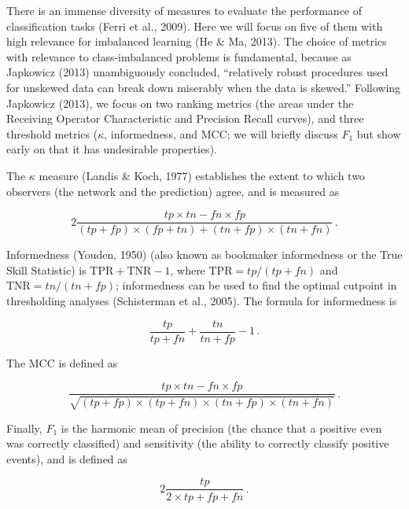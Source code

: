 \documentclass[11pt]{article}
\begin{document}
There is an immense diversity of measures to evaluate the performance of
classification tasks (Ferri et al., 2009). Here we will focus on five of
them with high relevance for imbalanced learning (He \& Ma, 2013). The
choice of metrics with relevance to class-imbalanced problems is
fundamental, because as Japkowicz (2013) unambiguously concluded,
``relatively robust procedures used for unskewed data can break down
miserably when the data is skewed.'' Following Japkowicz (2013), we
focus on two ranking metrics (the areas under the Receiving Operator
Characteristic and Precision Recall curves), and three threshold metrics
(\(\kappa\), informedness, and MCC; we will briefly discuss \(F_1\) but
show early on that it has undesirable properties).

The \(\kappa\) measure (Landis \& Koch, 1977) establishes the extent to
which two observers (the network and the prediction) agree, and is
measured as

\[
2\frac{tp\times tn - fn\times fp}{(tp+fp)\times (fp+tn)+(tn+fp)\times (tn+fn)} \,.
\]

Informedness (Youden, 1950) (also known as bookmaker informedness or the
True Skill Statistic) is \(\text{TPR}+\text{TNR}-1\), where
\(\text{TPR}= tp/(tp+fn)\) and \(\text{TNR} = tn/(tn+fp)\); informedness
can be used to find the optimal cutpoint in thresholding analyses
(Schisterman et al., 2005). The formula for informedness is

\[\frac{tp}{tp+fn}+\frac{tn}{tn+fp}-1\,.\]

The MCC is defined as

\[
\frac{tp\times tn - fn\times fp}{\sqrt{(tp+fp)\times (tp+fn)\times (tn+fp)\times (tn+fn)}} \,.
\]

Finally, \(F_1\) is the harmonic mean of precision (the chance that a
positive even was correctly classified) and sensitivity (the ability to
correctly classify positive events), and is defined as

\[
2\frac{tp}{2\times tp + fp + fn}\,.
\]
\end{document}
